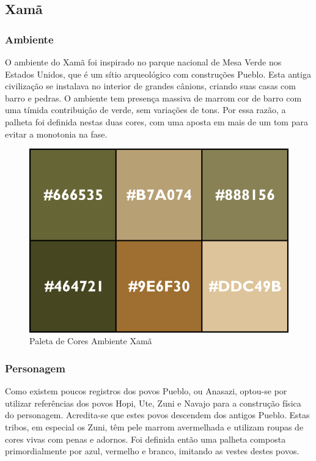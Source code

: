 \clearpage

\subsection{Xamã}

\subsubsection{Ambiente}
O ambiente do Xamã foi inspirado no parque nacional de Mesa Verde nos Estados Unidos, que é um sítio arqueológico com construções Pueblo. Esta antiga civilização se instalava no interior de grandes cânions, criando suas casas com barro e pedras. O ambiente tem presença massiva de marrom cor de barro com uma tímida contribuição de verde, sem variações de tons. Por essa razão, a palheta foi definida nestas duas cores, com uma aposta em mais de um tom para evitar a monotonia na fase.

\begin{figure}[htb]
	\caption{\label{fig_paletaMesa}Paleta de Cores Ambiente Xamã}
	\begin{center}
	    \includegraphics[width=\textwidth/2]{imagens/PaletaMesaVerde.png}
	\end{center}
\end{figure}

\subsubsection{Personagem}
Como existem poucos registros dos povos Pueblo, ou Anasazi, optou-se por utilizar referências dos povos Hopi, Ute, Zuni e Navajo para a construção física do personagem. Acredita-se que estes povos descendem dos antigos Pueblo. Estas tribos, em especial os Zuni, têm pele marrom avermelhada e utilizam roupas de cores vivas com penas e adornos. Foi definida então uma palheta composta primordialmente por azul, vermelho e branco, imitando as vestes destes povos.

